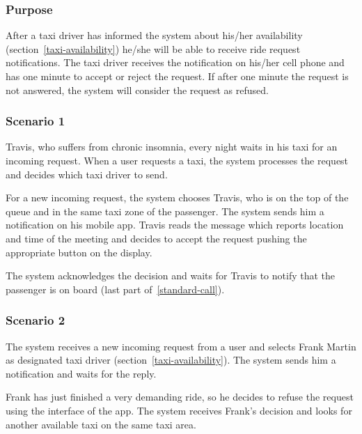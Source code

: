 \label{driver-notification}
\subsubsection{Purpose}

After a taxi driver has informed the system about his/her availability (section~\ref{taxi-availability})
he/she will be able to receive ride request notifications. The taxi driver receives the notification on his/her cell phone and has one minute to accept or reject the request. If after one minute the request is not answered, the system will consider the request as refused.

\subsubsection{Scenario 1}
Travis, who suffers from chronic insomnia, every night waits in his taxi for an incoming request. When a user requests a taxi, the system processes the request and decides which taxi driver to send.

For a new incoming request, the system chooses Travis, who is on the top of the queue and in the same taxi zone of the passenger. The system sends him a notification on his mobile app. Travis reads the message which reports location and time of the meeting and decides to accept the request pushing the appropriate button on the display.

The system acknowledges the decision and waits for Travis to notify that the passenger is on board (last part of~\ref{standard-call}).

\subsubsection{Scenario 2}
The system receives a new incoming request from a user and selects Frank Martin as designated taxi driver (section~\ref{taxi-availability}).
The system sends him a notification and waits for the reply.

Frank has just finished a very demanding ride, so he decides to refuse the request using the interface of the app. The system receives Frank's decision and looks for another available taxi on the same taxi area.

